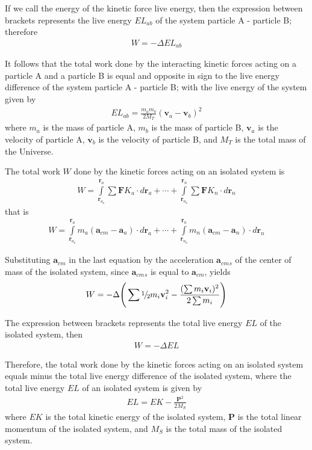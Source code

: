 \documentclass[12pt]{article}
\newcommand{\vA}{\mathbf{a}}
\newcommand{\vF}{\mathbf{F}}
\newcommand{\vP}{\mathbf{P}}
\newcommand{\vR}{\mathbf{r}}
\newcommand{\vV}{\mathbf{v}}
\newcommand{\nK}{{\scriptstyle K}}
\newcommand{\nL}{{\scriptstyle L}}
\newcommand{\mM}{m}
\newcommand{\mN}{M}
\newcommand{\mW}{W}
\newcommand{\mE}{E}
\newcommand{\rS}{_S}
\newcommand{\rT}{_T}
\newcommand{\ra}{_a}
\newcommand{\rb}{_b}
\newcommand{\rn}{_n}
\newcommand{\ri}{_i}
\newcommand{\rs}{_s}
\newcommand{\rab}{_{ab}}
\newcommand{\rao}{_{a_o}}
\newcommand{\rno}{_{n_o}}
\newcommand{\rcm}{_{cm}}
\begin{document}
\par If we call the energy of the kinetic force live energy, then the expression between brackets represents the live energy $\mE\nL\rab$ of the system particle A - particle B; therefore
\begin{eqnarray*}
\mW = -\Delta \mE\nL\rab
\end{eqnarray*}
\par It follows that the total work done by the interacting kinetic forces acting on a particle A and a particle B is equal and opposite in sign to the live energy difference of the system particle A - particle B; with the live energy of the system given by
\begin{eqnarray*}
\mE\nL\rab = \frac{\mM\ra\mM\rb}{2\mN\rT}(\vV\ra - \vV\rb)^2
\end{eqnarray*}
\noindent where $\mM\ra$ is the mass of particle A, $\mM\rb$ is the mass of particle B, $\vV\ra$ is the velocity of particle A, $\vV\rb$ is the velocity of particle B, and $\mN\rT$ is the total mass of the Universe.
\par The total work $\mW$ done by the kinetic forces acting on an isolated system is
\begin{eqnarray*}
\mW = \int\limits_{\vR\rao}^{\vR\ra}{\sum \vF\nK\ra \cdot d\vR\ra} + \cdots + \int\limits_{\vR\rno}^{\vR\rn}{\sum \vF\nK\rn \cdot d\vR\rn}
\end{eqnarray*}
\noindent that is
\begin{eqnarray*}
\mW = \int\limits_{\vR\rao}^{\vR\ra}{\mM\ra(\vA\rcm - \vA\ra) \cdot d\vR\ra} + \cdots + \int\limits_{\vR\rno}^{\vR\rn}{\mM\rn(\vA\rcm - \vA\rn) \cdot d\vR\rn}
\end{eqnarray*}
\par Substituting $\vA\rcm$ in the last equation by the acceleration $\vA\rcm{\rs}$ of the center of mass of the isolated system, since $\vA\rcm{\rs}$ is equal to $\vA\rcm$, yields
\begin{eqnarray*}
\mW = -\Delta \Bigg(\sum \raise.5ex\hbox{$\scriptstyle 1$}\kern-.1em/\kern-.15em\lower.25ex\hbox{$\scriptstyle 2$}\mM\ri\vV\ri^2 - \frac{(\sum \mM\ri\vV\ri)^2}{2\sum \mM\ri}\Bigg)
\end{eqnarray*}
\par The expression between brackets represents the total live energy $\mE\nL$ of the isolated system, then
\begin{eqnarray*}
\mW = -\Delta \mE\nL
\end{eqnarray*}
\par Therefore, the total work done by the kinetic forces acting on an isolated system equals minus the total live energy difference of the isolated system, where the total live energy $\mE\nL$ of an isolated system is given by
\begin{eqnarray*}
\mE\nL = \mE\nK - \frac{\vP^2}{2\mN\rS}
\end{eqnarray*}
\noindent where $\mE\nK$ is the total kinetic energy of the isolated system, $\vP$ is the total linear momentum of the isolated system, and $\mN\rS$ is the total mass of the isolated system.
\end{document}
